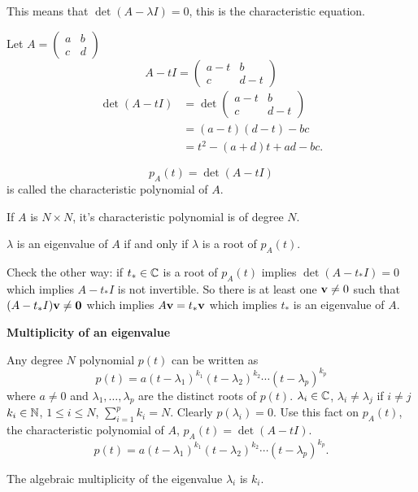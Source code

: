 \documentclass[10pt, a4paper]{article}
\begin{document}
This means that $\det(A - \lambda I) = 0$,
this is the characteristic equation.
\begin{example}
    Let $A = \begin{pmatrix}
        a & b \\ c & d
    \end{pmatrix}$
    \[
    A - tI = \begin{pmatrix}
        a - t & b \\ c & d - t
    \end{pmatrix}
    \]
    \begin{align*}
        \det(A - tI) &= \det\begin{pmatrix}
            a - t & b \\ c & d - t
        \end{pmatrix} \\
        &= (a - t)(d - t) - bc \\
        &= t ^ 2 - (a + d)t + ad - bc.
    \end{align*}
\end{example}

\begin{definition}
    \[
    p_A(t) = \det(A - tI)
    \]
    is called the characteristic polynomial of $A$.
\end{definition}

\begin{remark}
    If $A$ is $N \times N$,
    it's characteristic polynomial is of degree $N$.
\end{remark}

\begin{remark}
    $\lambda$ is an eigenvalue of $A$ if and only if $\lambda$ is a root of $p_A(t)$.

    Check the other way:
    if $t_{*} \in \mathbb{C}$ is a root of $p_A(t)$ implies $\det(A - t_{*}I) = 0$ which implies $A - t_{*}I$ is not invertible.
    So there is at least one $\mathbf{v} \neq 0$ such that $(A - t_{*}I)\mathbf{v} \neq \mathbf{0}$ which implies $A\mathbf{v} = t_{*}\mathbf{v}$ which implies $t_{*}$ is an eigenvalue of $A$.
\end{remark}

\textbf{Multiplicity of an eigenvalue}

Any degree $N$ polynomial $p(t)$ can be written as
\[
p(t) = a(t - \lambda_1) ^ {k_1}(t - \lambda_2) ^ {k_2} \dotsi (t - \lambda_p) ^ {k_p}
\]
where $a \neq 0$ and $\lambda_1, \dotsc, \lambda_p$ are the distinct roots of $p(t)$.
$\lambda_i \in \mathbb{C}$,
$\lambda_i \neq \lambda_j$ if $i \neq j$
$k_i \in \mathbb{N}$,
$1 \leq i \leq N$,
$\sum_{i = 1}^{p}k_i = N$.
Clearly $p(\lambda_i) = 0$.
Use this fact on $p_A(t)$,
the characteristic polynomial of $A$,
$p_A(t) = \det(A - tI)$.
\[
p(t) = a(t - \lambda_1) ^ {k_1}(t - \lambda_2) ^ {k_2} \dotsi (t - \lambda_p) ^ {k_p}.
\]
\begin{definition}
    The algebraic multiplicity of the eigenvalue $\lambda_i$ is $k_i$.
\end{definition}
\end{document}
